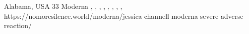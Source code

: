           {
            Alabama, USA
          }
          {
            33
          }
          {
            Moderna
          }
          {
            , 
          }
          {
            ,
            ,
            ,
            ,
            ,
            ,
            ,
          }
          {
            https://nomoresilence.world/moderna/jessica-channell-moderna-severe-adverse-reaction/
          }

